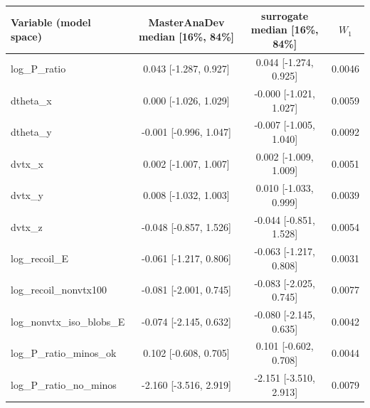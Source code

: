 \begin{tabular}{lccc}
\toprule
Variable (model space) & MasterAnaDev median [16\%, 84\%] & surrogate median [16\%, 84\%] & $W_1$ \\
\midrule
log\_P\_ratio & 0.043 [-1.287, 0.927] & 0.044 [-1.274, 0.925] & 0.0046 \\
dtheta\_x & 0.000 [-1.026, 1.029] & -0.000 [-1.021, 1.027] & 0.0059 \\
dtheta\_y & -0.001 [-0.996, 1.047] & -0.007 [-1.005, 1.040] & 0.0092 \\
dvtx\_x & 0.002 [-1.007, 1.007] & 0.002 [-1.009, 1.009] & 0.0051 \\
dvtx\_y & 0.008 [-1.032, 1.003] & 0.010 [-1.033, 0.999] & 0.0039 \\
dvtx\_z & -0.048 [-0.857, 1.526] & -0.044 [-0.851, 1.528] & 0.0054 \\
log\_recoil\_E & -0.061 [-1.217, 0.806] & -0.063 [-1.217, 0.808] & 0.0031 \\
log\_recoil\_nonvtx100 & -0.081 [-2.001, 0.745] & -0.083 [-2.025, 0.745] & 0.0077 \\
log\_nonvtx\_iso\_blobs\_E & -0.074 [-2.145, 0.632] & -0.080 [-2.145, 0.635] & 0.0042 \\
log\_P\_ratio\_minos\_ok & 0.102 [-0.608, 0.705] & 0.101 [-0.602, 0.708] & 0.0044 \\
log\_P\_ratio\_no\_minos & -2.160 [-3.516, 2.919] & -2.151 [-3.510, 2.913] & 0.0079 \\
\bottomrule
\end{tabular}

